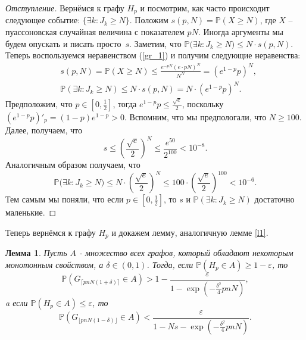 \documentclass{matmex-diploma-custom}
\newcommand{\PRob}{\mathbb P}
\newcommand{\leqs}{\leqslant}
\newcommand{\geqs}{\geqslant}
\newcommand{\eps}{\varepsilon}
\newtheorem{lemma}{Лемма}
\theoremstyle{named}
\begin{document}
\smallskip

\begin{proof}[Отступление]
Вернёмся к графу $H_p$ и посмотрим, как часто происходит следующее событие: $\{\exists k : J_k \geqs N\}$.
Положим $s(p, N) = \PRob(X \geqs N)$, где $X$ -- пуассоновская случайная величина с показателем $pN$.
Иногда аргументы мы будем опускать и писать просто~$s$.
Заметим, что $\PRob\big(\exists k : J_k \geqs N\big) \leqs N \cdot s(p, N)$. 
Теперь воспользуемся неравенством (\ref{gr_1}) и получим следующие неравенства:
\begin{align}\label{ot_1}
&s(p,N) = \PRob(X \geqs N) \leqs \frac{e^{-pN}(e\cdot pN)^N}{N^N} = (e^{1-p} p )^N,
\\ \label{s_1}
&\PRob(\exists k : J_k \geqs N) \leqs N \cdot s(p, N) = N \cdot (e^{1-p} p )^N.
\end{align} 
Предположим, что $p \in [0, \frac{1}{2}]$, тогда $e^{1-p} p \leqs \frac{\sqrt{e}}{2}$, 
поскольку $(e^{1-p} p)'_p = (1-p) e^{1-p} > 0$. 
Вспомним, что мы предпологали, что $N \geqs 100$. Далее, получаем, что 
\begin{equation}
s \leqs \left(\frac{\sqrt{e}}{2}\right)^N \leqs \frac{e^{50}}{2^{100}} < 10^{-8}.
\end{equation}
Аналогичным образом получаем, что 
\begin{equation}
\PRob\big(\exists k : J_k \geqs N\big) \leqs N \cdot \left(\frac{\sqrt{e}}{2}\right)^N
\leqs 100 \cdot \left(\frac{\sqrt{e}}{2}\right)^{100} < 10^{-6}.
\end{equation}
Тем самым мы поняли, что если $p \in [0, \frac{1}{2}]$, то $s$ и $\PRob(\exists k : J_k \geqs N)$ достаточно маленькие.
\end{proof}

Теперь вернёмся к графу $H_p$ и докажем лемму, аналогичную лемме \ref{l1}.

\begin{lemma} \label{l3}
Пусть $A$ - множество всех графов, который обладают некоторым монотонным свойством, а $\delta \in (0,1)$.
Тогда, если $\PRob( H_p \in A) \geqs 1 - \eps$, то
\begin{equation} \label{l3_1}
\PRob(G_{\lceil pnN(1+\delta) \rceil} \in A) > 1 - \frac{\eps}{1 - \exp\left(-\frac{\delta^2}{4}pnN\right)},
\end{equation}
a если $\PRob( H_p \in A) \leqs \eps$, то
\begin{equation}\label{l3_2}
\PRob(G_{\lfloor pnN(1-\delta) \rfloor} \in A) < \frac{\eps}{1 - Ns - \exp\left(-\frac{\delta^2}{4}pnN\right)}.
\end{equation}
\end{lemma}
\end{document}
